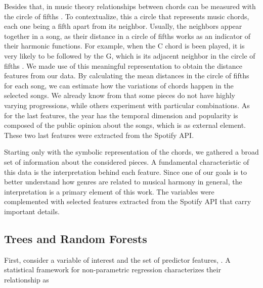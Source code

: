 \documentclass[twocolumn]{article}
\begin{document}
Besides that, in music theory
relationships between chords can be measured with the
circle of fifths \cite{Lewin1982}. 
To contextualize, this a circle that 
represents music chords, each one being  
a fifth apart from its neighbor. Usually, the 
neighbors appear together in a song,
as their distance in a circle of fifths
works as an indicator of their
harmonic functions. For example, 
when the C chord is been played, it is
very likely to be followed by the G, which
is its adjacent neighbor in the circle
of fifths \cite{Lerdahl1977}. We made use of 
this meaningful representation to obtain the 
distance features from our data. By calculating the
mean distances in the circle of fifths for each 
song, we can estimate how the variations of 
chords happen in the selected songs.
We already know from  \cite{Absolu2010}
that some pieces do not have highly varying
progressions, while others experiment with 
particular combinations. As for the last features, 
the year has the temporal dimension and popularity 
is composed of the public opinion about the songs,
which is as external element. These
two last features were extracted from the Spotify API. 

Starting only with the 
symbolic representation of the chords, we gathered
a broad set of information about the considered pieces.
A fundamental characteristic
of this data is the interpretation behind each feature.
Since one of our goals is to better understand how
genres are related to musical harmony in general, 
the interpretation is a primary element of this work. 
The variables were complemented with selected
features extracted from the Spotify API that carry important details. 

\subsection{Trees and Random Forests}

First, consider a variable of interest  
and  the set 
of predictor features, . A statistical
framework for non-parametric regression characterizes
their relationship as 
\end{document}
